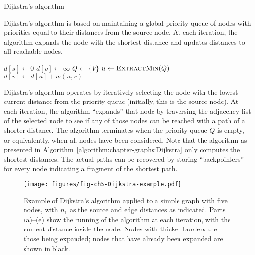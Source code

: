\begin{algorithm}[t]
\caption{Dijkstra's algorithm}
\label{algorithm:chapter-graphs:Dijkstra}
Dijkstra's algorithm is based on maintaining a global priority queue
of nodes with priorities equal to their distances from the source
node.  At each iteration, the algorithm expands the node with the
shortest distance and updates distances to all reachable nodes.

  \algrenewcommand\algorithmicfunction{}
  \begin{algorithmic}[1]
    \State $d[s] \gets 0$
      \State $d[v] \gets \infty$
    \EndFor
    \State $Q \gets \{V\}$
      \State $u \gets \textsc{ExtractMin}(Q)$
          \State $d[v] \gets d[u] + w(u,v)$
        \EndIf
      \EndFor
    \EndWhile
    \EndFunction
  \end{algorithmic}
\end{algorithm}

Dijkstra's algorithm operates by iteratively selecting the node with
the lowest current distance from the priority queue (initially, this
is the source node).  At each iteration, the algorithm ``expands''
that node by traversing the adjacency list of the selected node to see
if any of those nodes can be reached with a path of a shorter
distance.  The algorithm terminates when the priority queue $Q$ is
empty, or equivalently, when all nodes have been considered.  Note
that the algorithm as presented in
Algorithm~\ref{algorithm:chapter-graphs:Dijkstra} only computes the shortest
distances.  The actual paths can be recovered by storing
``backpointers'' for every node indicating a fragment of the shortest
path.

\begin{figure}[t]
\begin{center}
\texttt{[image: figures/fig-ch5-Dijkstra-example.pdf]}
\end{center}
\caption{Example of Dijkstra's algorithm applied to a simple graph
  with five nodes, with $n_1$ as the source and edge distances as
  indicated.  Parts (a)--(e) show the running of the algorithm at each
  iteration, with the current distance inside the node.  Nodes with
  thicker borders are those being expanded; nodes that have already
  been expanded are shown in black.}
\label{figure:chapter-graphs:Dijkstra-example}
\end{figure}

